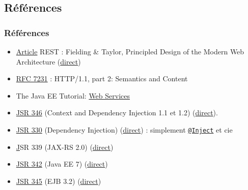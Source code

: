 \documentclass[english, french]{beamer}
\begin{document}
\subsection{Références}
\begin{frame}
	\frametitle{Références}
	\begin{itemize}
		\item \href{http://dx.doi.org/10.1145/337180.337228}{Article} REST : Fielding \& Taylor, Principled Design of the Modern Web Architecture (\href{https://www.ics.uci.edu/~fielding/pubs/webarch_icse2000.pdf}{direct})%
		\item \href{http://www.w3.org/Protocols/}{RFC 7231} : HTTP/1.1, part 2: Semantics and Content
		\item The Java EE Tutorial: \href{http://docs.oracle.com/javaee/7/tutorial/partwebsvcs.htm}{Web Services}
		\item \href{https://jcp.org/en/jsr/detail?id=346}{JSR 346} (Context and Dependency Injection 1.1 et 1.2) (\href{http://download.oracle.com/otn-pub/jcp/cdi-1_2-mrel-eval-spec/cdi-1.2.pdf}{direct}).
		\item \href{https://jcp.org/en/jsr/detail?id=330}{JSR 330} (Dependency Injection) (\href{http://download.oracle.com/otn-pub/jcp/dependency_injection-1.0-final-oth-JSpec/dependency_injection-1_0-final-spec.zip}{direct}) : simplement \href{http://docs.oracle.com/javaee/7/api/javax/inject/Inject.html}{\texttt{@Inject}} et cie
		\item \href{https://jcp.org/en/jsr/detail?id=339} JSR 339 (JAX-RS 2.0) (\href{http://download.oracle.com/otn-pub/jcp/jaxrs-2_0_rev_A-mrel-eval-spec/jsr339-jaxrs-2.0-final-spec.pdf}{direct})
		\item \href{https://jcp.org/en/jsr/detail?id=342}{JSR 342} (Java EE 7) (\href{http://download.oracle.com/otn-pub/jcp/java_ee-7-mrel-eval-spec/JavaEE_Platform_Spec.pdf}{direct})
		\item \href{https://jcp.org/en/jsr/detail?id=345}{JSR 345} (EJB 3.2) (\href{http://download.oracle.com/otn-pub/jcp/ejb-3_2-fr-eval-spec/ejb-3_2-core-fr-spec.pdf}{direct})
	\end{itemize}
\end{frame}
\end{document}
